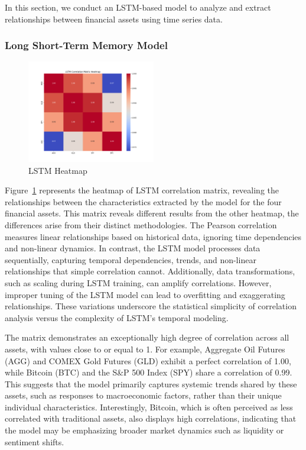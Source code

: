 \documentclass{article}
\begin{document}
In this section, we conduct an LSTM-based model to analyze and extract relationships between financial assets using time series data.


\subsubsection{Long Short-Term Memory Model}





\begin{figure}[h!]
    \centering
    \includegraphics[width=0.5\textwidth]{src/models/results/lstm_correlation_heatmap_with_labels.png}
    \caption{LSTM Heatmap}
    \label{lstmh}
    
\end{figure}


Figure~\ref{lstmh} represents the heatmap of LSTM correlation matrix, revealing the relationships between the characteristics extracted by the model for the four financial assets. This matrix reveals different results from the other heatmap, the differences arise from their distinct methodologies. The Pearson correlation measures linear relationships based on historical data, ignoring time dependencies and non-linear dynamics. In contrast, the LSTM model processes data sequentially, capturing temporal dependencies, trends, and non-linear relationships that simple correlation cannot. Additionally, data transformations, such as scaling during LSTM training, can amplify correlations. However, improper tuning of the LSTM model can lead to overfitting and exaggerating relationships. These variations underscore the statistical simplicity of correlation analysis versus the complexity of LSTM’s temporal modeling. 

The matrix demonstrates an exceptionally high degree of correlation across all assets, with values close to or equal to 1. For example, Aggregate Oil Futures (AGG) and COMEX Gold Futures (GLD) exhibit a perfect correlation of 1.00, while Bitcoin (BTC) and the S\&P 500 Index (SPY) share a correlation of 0.99. This suggests that the model primarily captures systemic trends shared by these assets, such as responses to macroeconomic factors, rather than their unique individual characteristics. Interestingly, Bitcoin, which is often perceived as less correlated with traditional assets, also displays high correlations, indicating that the model may be emphasizing broader market dynamics such as liquidity or sentiment shifts.
\end{document}
